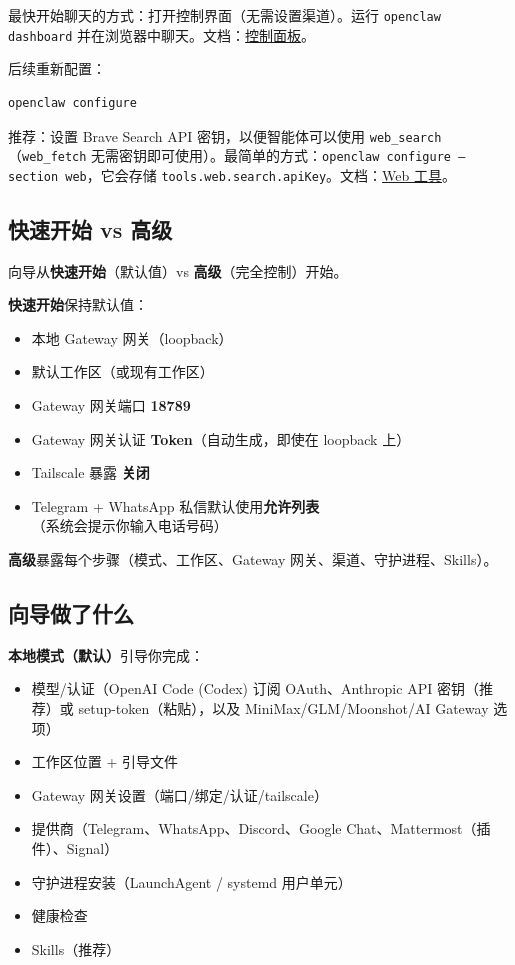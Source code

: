 最快开始聊天的方式：打开控制界面（无需设置渠道）。运行 \texttt{openclaw dashboard} 并在浏览器中聊天。文档：\href{/web/dashboard}{控制面板}。

后续重新配置：

\begin{lstlisting}[language=bash]
openclaw configure
\end{lstlisting}


推荐：设置 Brave Search API 密钥，以便智能体可以使用 \texttt{web\_search}（\texttt{web\_fetch} 无需密钥即可使用）。最简单的方式：\texttt{openclaw configure --section web}，它会存储 \texttt{tools.web.search.apiKey}。文档：\href{/tools/web}{Web 工具}。

\subsection{快速开始 vs 高级}


向导从\textbf{快速开始}（默认值）vs \textbf{高级}（完全控制）开始。

\textbf{快速开始}保持默认值：

\begin{itemize}
  \item 本地 Gateway 网关（loopback）
  \item 默认工作区（或现有工作区）
  \item Gateway 网关端口 \textbf{18789}
  \item Gateway 网关认证 \textbf{Token}（自动生成，即使在 loopback 上）
  \item Tailscale 暴露 \textbf{关闭}
  \item Telegram + WhatsApp 私信默认使用\textbf{允许列表}（系统会提示你输入电话号码）
\end{itemize}


\textbf{高级}暴露每个步骤（模式、工作区、Gateway 网关、渠道、守护进程、Skills）。

\subsection{向导做了什么}


\textbf{本地模式（默认）}引导你完成：

\begin{itemize}
  \item 模型/认证（OpenAI Code (Codex) 订阅 OAuth、Anthropic API 密钥（推荐）或 setup-token（粘贴），以及 MiniMax/GLM/Moonshot/AI Gateway 选项）
  \item 工作区位置 + 引导文件
  \item Gateway 网关设置（端口/绑定/认证/tailscale）
  \item 提供商（Telegram、WhatsApp、Discord、Google Chat、Mattermost（插件）、Signal）
  \item 守护进程安装（LaunchAgent / systemd 用户单元）
  \item 健康检查
  \item Skills（推荐）
\end{itemize}


